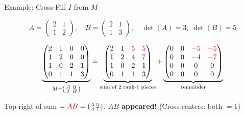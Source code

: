 \documentclass[10pt]{beamer}
\theoremstyle{definition}
\newcommand{\x}[1]{\alert{\textbf{#1}}}
\newcommand{\rd}[1]{{\color{red!70!black}#1}}
\begin{document}
\begin{frame}[fragile]{Example: Cross-Fill $I$ from $M$}

$$A = \begin{pmatrix} 2 & 1 \\ 1 & 2 \end{pmatrix},\quad B = \begin{pmatrix} 2 & 1 \\ 1 & 3 \end{pmatrix}, \quad \det(A)=3,\;\det(B)=5$$

\vfill

$$\underbrace{\begin{pmatrix} 2&1&0&0\\ 1&2&0&0\\ 1&0&2&1\\ 0&1&1&3 \end{pmatrix}}_{M = \left(\begin{smallmatrix} A&0\\ I&B \end{smallmatrix}\right)}
=
\underbrace{\begin{pmatrix} 2&1&\rd{5}&\rd{5}\\ 1&2&\rd{4}&\rd{7}\\ 1&0&2&1\\ 0&1&1&3 \end{pmatrix}}_{\text{sum of 2 rank-1 pieces}}
+
\underbrace{\begin{pmatrix} 0&0&\rd{-5}&\rd{-5}\\ 0&0&\rd{-4}&\rd{-7}\\ 0&0&0&0\\ 0&0&0&0 \end{pmatrix}}_{\text{remainder}}$$

\vfill

Top-right of sum $= \rd{AB} = \left(\begin{smallmatrix}5&5\\4&7\end{smallmatrix}\right)$.
\quad \x{$AB$ appeared!} \quad (Cross-centers: both $= 1$)

\end{frame}
\end{document}
